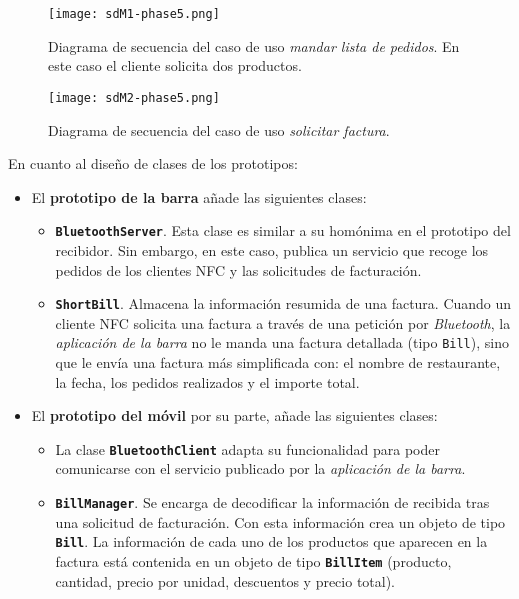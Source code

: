   \begin{sidewaysfigure}[h]
    \begin{center}
      \texttt{[image: sdM1-phase5.png]}
      \caption{Diagrama de secuencia del caso de uso \emph{mandar lista
      de pedidos}. En este caso el cliente solicita dos productos.}
      \label{fig:sdM1-phase5}
    \end{center}
  \end{sidewaysfigure}

  \begin{sidewaysfigure}[h]
    \begin{center}
      \texttt{[image: sdM2-phase5.png]}
      \caption{Diagrama de secuencia del caso de uso \emph{solicitar factura}.}
      \label{fig:sdM2-phase5}
    \end{center}
  \end{sidewaysfigure}

En cuanto al diseño de clases de los prototipos:
\begin{itemize}
\item El \textbf{prototipo de la barra} añade las siguientes clases:
  \begin{itemize}
  \item \textbf{\texttt{BluetoothServer}}. Esta clase es similar a su homónima 
  en el prototipo del recibidor. Sin embargo, en este caso, publica un servicio 
  que recoge los pedidos de los clientes \acs{NFC} y las solicitudes de
  facturación.
  \item \textbf{\texttt{ShortBill}}. Almacena la información resumida de una 
  factura. Cuando un cliente \acs{NFC} solicita una factura a través de una 
  petición por \emph{Bluetooth}, la \emph{aplicación de la barra} no le manda 
  una factura detallada (tipo \texttt{Bill}), sino que le envía una factura más
  simplificada con: el nombre de restaurante, la fecha, los pedidos realizados
  y el importe total.
  \end{itemize}
\item El \textbf{prototipo del móvil} por su parte, añade las siguientes
clases:
  \begin{itemize}
  \item La clase \textbf{\texttt{BluetoothClient}} adapta su funcionalidad para 
  poder comunicarse con el servicio publicado por la \emph{aplicación de la 
  barra}.
  \item \textbf{\texttt{BillManager}}. Se encarga de decodificar la información 
  de recibida tras una solicitud de facturación. Con esta información crea un
  objeto de tipo \textbf{\texttt{Bill}}. La información de cada uno de los
  productos que aparecen en la factura está contenida en un objeto de tipo
  \textbf{\texttt{BillItem}} (producto, cantidad, precio por unidad, descuentos
  y precio total).
  \end{itemize}
\end{itemize}

